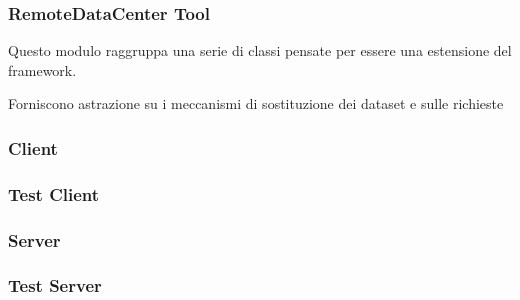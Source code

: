 \subsubsection{RemoteDataCenter Tool}
\label{subsub:remotedatacentertoolmodule}
Questo modulo raggruppa una serie di classi pensate per essere una estensione del framework.

Forniscono astrazione su i meccanismi di sostituzione dei dataset e sulle richieste


\subsubsection{Client}
\label{subsub:clientmodule}
\subsubsection{Test Client}
\label{subsub:tclientmodule}
\subsubsection{Server}
\label{subsub:servermodule}
\subsubsection{Test Server}
\label{subsub:tservermodule}